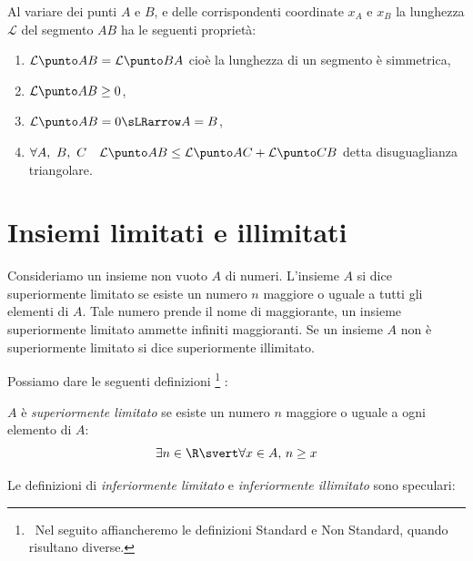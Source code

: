 Al variare dei punti \(A\) e \(B\), e delle corrispondenti coordinate 
\(x_A\) e \(x_B\) la lunghezza \(\mathcal{L}\) del segmento \(AB\) ha le 
seguenti proprietà:
\begin{enumerate}
\item \(\lung{A}{B} =\lung{B}{A}\) 
cioè la lunghezza di un segmento è simmetrica,
\item \(\lung{A}{B} \geq 0\),
\item \(\lung{A}{B} = 0 \sLRarrow A = B\),
\item \(\forall A,~B,~C \quad \lung{A}{B} \leq \lung{A}{C} + \lung{C}{B}\) 
detta disuguaglianza triangolare.
\end{enumerate}

\section{Insiemi limitati e illimitati}
\label{sec:topologiainsiemi}

Consideriamo un insieme non vuoto \(A\) di numeri. 
L'insieme \(A\) si dice superiormente limitato se esiste un numero 
\(n\) maggiore o uguale a tutti gli elementi di \(A\). 
Tale numero prende il nome di maggiorante, un insieme superiormente limitato 
ammette infiniti maggioranti. Se un insieme \(A\) non è superiormente 
limitato si dice superiormente illimitato.

Possiamo dare le seguenti definizioni
\footnote{~Nel seguito affiancheremo le definizioni Standard e Non Standard, 
quando risultano diverse.}
:

\begin{newdef}{}{}
\(A\) è \emph{superiormente limitato} se esiste un numero \(n\) 
maggiore o uguale a ogni elemento di \(A\):
\[\exists n \in \R \svert \forall x \in A,\, n \geq x\]
\end{newdef}


\vspace{.5em}
Le definizioni di \emph{inferiormente limitato} e \emph{inferiormente 
illimitato} sono speculari:

